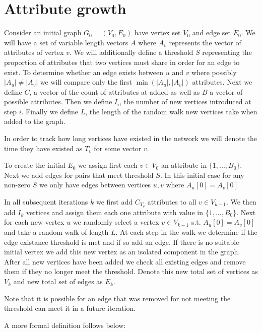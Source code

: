 \documentclass{article}
\begin{document}
\section{Attribute growth}

Consider an initial graph $G_0 = (V_0, E_0)$ have vertex set $V_0$ and edge set $E_0$.
We will have a set of variable length vectors $A$ where $A_v$ represents the vector of attributes of vertex $v$.
We will additionally define a threshold $S$ representing the proportion of attributes that two vertices must share in order for an edge to exist.
To determine whether an edge exists between $u$ and $v$ where possibly $|A_u| \neq |A_v|$ we will compare only the first $\min(|A_u|, |A_v|)$ attributes.
Next we define $C$, a vector of the count of attributes at added as well as $B$ a vector of possible attributes.
Then we define $I_i$, the number of new vertices introduced at step $i$.
Finally we define $L$, the length of the random walk new vertices take when added to the graph.

In order to track how long vertices have existed in the network we will denote the time they have existed as $T_v$ for some vector $v$.

To create the initial $E_0$ we assign first each $v \in V_0$ an attribute in $\{1, ..., B_0\}$.
Next we add edges for pairs that meet threshold $S$.
In this initial case for any non-zero $S$ we only have edges between vertices $u, v$ where $A_u[0] = A_v[0]$

In all subsequent iterations $k$ we first add $C_{T_v}$ attributes to all $v \in V_{k-1}$.
We then add $I_k$ vertices and assign them each one attribute with value in $\{1, ..., B_0\}$.
Next for each new vertex $u$ we randomly select a vertex $v \in V_{k-1}$ s.t. $A_u[0] = A_v[0]$ and take a random walk of length $L$.
At each step in the walk we determine if the edge existance threshold is met and if so add an edge.
If there is no suitable initial vertex we add this new vertex as an isolated component in the graph.
After all new vertices have been added we check all existing edges and remove them if they no longer meet the threshold.
Denote this new total set of vertices as $V_k$ and new total set of edges as $E_k$.

Note that it is possible for an edge that was removed for not meeting the threshold can meet it in a future iteration.

A more formal definition follows below:
\end{document}
